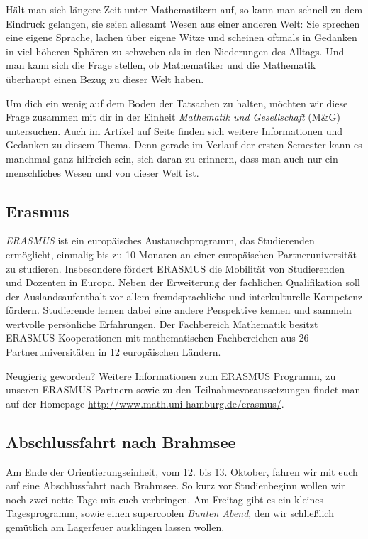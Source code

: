 Hält man sich längere Zeit unter Mathematikern auf, so kann man schnell zu dem
Eindruck gelangen, sie seien allesamt Wesen aus einer anderen Welt: Sie
sprechen eine eigene Sprache, lachen über eigene Witze und scheinen oftmals in
Gedanken in viel höheren Sphären zu schweben als in den Niederungen des
Alltags.  Und man kann sich die Frage stellen, ob Mathematiker und die
Mathematik überhaupt einen Bezug zu dieser Welt haben.


Um dich ein wenig auf dem Boden der Tatsachen zu halten, möchten wir diese
Frage zusammen mit dir in der Einheit \emph{Mathematik und Gesellschaft} (M\&G)
untersuchen. Auch im Artikel auf Seite \pageref{page:mug} finden sich weitere
Informationen und Gedanken zu diesem Thema. Denn gerade im Verlauf der ersten
Semester kann es manchmal ganz hilfreich sein, sich daran zu erinnern, dass man
auch nur ein menschliches Wesen und von dieser Welt ist.

\subsection{Erasmus}


\emph{ERASMUS} ist ein europäisches Austauschprogramm, das Studierenden
ermöglicht, einmalig bis zu 10 Monaten an einer europäischen Partneruniversität
zu studieren. Insbesondere fördert ERASMUS die Mobilität von Studierenden und
Dozenten in Europa. Neben der Erweiterung der fachlichen Qualifikation soll der
Auslandsaufenthalt vor allem fremdsprachliche und interkulturelle Kompetenz
fördern. Studierende lernen dabei eine andere Perspektive kennen und sammeln
wertvolle persönliche Erfahrungen. Der Fachbereich Mathematik besitzt ERASMUS
Kooperationen mit mathematischen Fachbereichen aus 26 Partneruniversitäten in
12 europäischen Ländern.

Neugierig geworden? Weitere Informationen zum ERASMUS Programm, zu unseren
ERASMUS Partnern sowie zu den Teilnahmevoraussetzungen findet man auf der
Homepage \url{http://www.math.uni-hamburg.de/erasmus/}.

\subsection*{Abschlussfahrt nach Brahmsee}

Am Ende der Orientierungseinheit, vom 12. bis 13. Oktober, fahren wir mit euch
auf eine Abschlussfahrt nach Brahmsee. So kurz vor Studienbeginn wollen wir
noch zwei nette Tage mit euch verbringen. Am Freitag gibt es ein kleines
Tagesprogramm, sowie einen supercoolen \emph{Bunten Abend}, den wir schließlich
gemütlich am Lagerfeuer ausklingen lassen wollen. 

